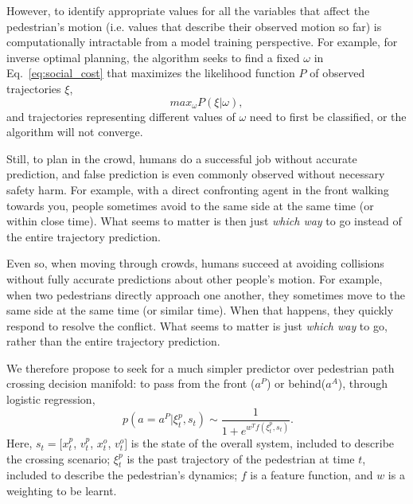 \documentclass[conference]{IEEEtran}
\begin{document}

However, to identify appropriate values for all the variables that affect the 
pedestrian's motion (i.e. values that describe their observed motion so far)
is computationally intractable 
from a model training perspective. For example, for inverse optimal planning, 
the algorithm seeks to find a fixed $\omega$ in 
Eq.~\ref{eq:social_cost} that maximizes the likelihood function $P$ of 
observed trajectories $\xi$,
\begin{equation}
  max_{\omega} P(\xi|\omega),
\end{equation}
and trajectories representing different values of $\omega$ need to first be 
classified, or the algorithm will not converge. 

Still, to plan in the crowd, humans do a successful job without accurate 
prediction, and false prediction is even commonly observed without necessary 
safety harm. For example, with a direct confronting agent in the front walking 
towards you, people sometimes avoid to the same side at the same time (or 
within close time). What seems to matter is then just \textit{which way} 
to go instead of the entire trajectory prediction. 

Even so, when moving through crowds, humans
succeed at avoiding collisions without fully accurate predictions
about other people's motion. For example, when two pedestrians
directly approach one another, they sometimes move to the same side at
the same time (or similar time).  When that happens, they quickly
respond to resolve the conflict.  What seems to matter is just
\textit{which way} to go, rather than the entire trajectory
prediction.

We therefore propose to seek for a much simpler predictor over pedestrian path 
crossing decision manifold: to pass from the front ($a^P$) or behind($a^A$), 
through logistic regression,
\begin{equation}~\label{eq:logi}
p(a=a^P|\xi^p_t, s_t) \sim \frac{1}{1+e^{w^Tf(\xi^p_t, s_t)}}.
\end{equation}
Here, $s_t = [x^p_t$, $v^p_t$, $x^o_t$, $v^o_t]$ is the state of the overall 
system, included to describe the crossing scenario;
$\xi^p_t$ is the past 
trajectory of the pedestrian at time $t$, included to describe the 
pedestrian's dynamics;
$f$ is a feature function, and $w$ is a weighting to be learnt.
\end{document}
